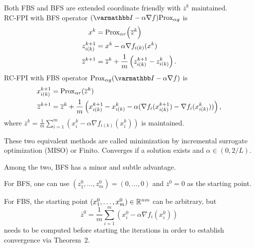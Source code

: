 \documentclass[10pt,mathserif]{beamer}
\begin{document}
\begin{frame}
Both FBS and BFS are extended coordinate friendly with $\overline{z}^k$ maintained.\\
\pause
RC-FPI with BFS operator $(\opI-\alpha \nabla f)\prox_{\alpha g}$ is
\begin{align*}
x^k&= \mathrm{Prox}_{\alpha r}\Big(\overline{z}^k\Big)\\
  z_{i(k)}^{k+1} & = x^k - \alpha \nabla f_{i(k)}(x^k)\\
  \overline{z}^{k+1} & = \overline{z}^k + \frac{1}{m}  \left(z_{i(k)}^{k+1} - z_{i(k)}^k\right).
\end{align*}
RC-FPI with FBS operator $\prox_{\alpha g}(\opI-\alpha \nabla f)$ is
\begin{align*}
x_{i(k)}^{k+1}&=\mathrm{Prox}_{\alpha r}(\overline{z}^{k})\\
\overline{z}^{k+1}&=\overline{z}^k+\frac{1}{m}\left(x^{k+1}_{i(k)}-x^k_{i(k)}-\alpha (\nabla f_i(x_{i(k)}^{k+1})-\nabla f_i(x_{i(k)}^k))\right),
\end{align*}
where
$\overline{z}^{k}=\frac{1}{m}\sum^m_{i=1}(x^k_i-\alpha \nabla f_{i(k)}(x_{i}^k))$ is maintained.

\pause
These two equivalent methods are called minimization by incremental surrogate optimization (MISO) or Finito. 
Converges if a solution exists and $\alpha\in(0,2/L)$.
\end{frame}

\begin{frame}
Among the two, BFS has a minor and subtle advantage.

\vspace{0.2in}
For BFS, one can use $(z^0_1,\dots,z^0_m)=(0,\dots,0)$ and $\overline{z}^0=0$ as the starting point.

\vspace{0.2in}
For FBS, the starting point $(x^0_1,\dots,x^0_m)\in\mathbb{R}^{nm}$ can be arbitrary, but
\[
\overline{z}^0=\frac{1}{m}\sum^m_{i=1}\left(x^0_i-\alpha\nabla f_i(x^0_i)\right)
\]
needs to be computed before starting the iterations in order to establish convergence via Theorem~2.
\end{frame}
\end{document}
